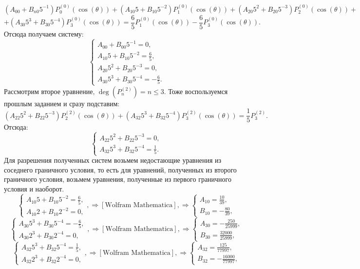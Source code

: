 \documentclass[11pt]{article}
\begin{document}
 $$(A_{00}+B_{n0}5^{-1})P_0^{(0)}(\cos(\theta))+(A_{10}5+B_{10}5^{-2})P_1^{(0)}(\cos(\theta))+(A_{20}5^2+B_{20}5^{-3})P_2^{(0)}(\cos(\theta))+$$$$+(A_{30}5^3+B_{30}5^{-4})P_3^{(0)}(\cos(\theta))=\frac{6}{5}P_1^{(0)}(\cos(\theta))-\frac{6}{5}P_3^{(0)}(\cos(\theta)).$$
 Отсюда получаем систему:
 $$\begin{cases}
     A_{00}+B_{00}5^{-1}=0,\\
     A_{10}5+B_{10}5^{-2}=\frac{6}{5},\\
     A_{20}5^2+B_{20}5^{-3}=0,\\
     A_{30}5^3+B_{30}5^{-4}=-\frac{6}{5}.
 \end{cases}$$
 Рассмотрим второе уравнение, $\deg(P_n^{(2)})=n\leq3.$ Тоже воспользуемся прошлым заданием и сразу подставим:
 $$(A_{22}5^2+B_{22}5^{-3})P_2^{(2)}(\cos(\theta))+(A_{32}5^3+B_{32}5^{-4})P_3^{(2)}(\cos(\theta))=\frac{1}{5}P_3^{(2)}.$$
 Отсюда:
 $$\begin{cases}
     A_{22}5^2+B_{22}5^{-3}=0,\\
     A_{32}5^3+B_{32}5^{-4}=\frac{1}{5}.
 \end{cases}$$
 Для разрешения полученных систем возьмем недостающие уравнения из соседнего граничного условия, то есть для уравнений, полученных из второго граничного условия, возьмем уравнения, полученные из первого граничного условия и наоборот.
 $$\begin{cases}
     A_{10}5+B_{10}5^{-2}=\frac{6}{5},\\
     A_{10}2+B_{10}2^{-2}=0,
 \end{cases},\Rightarrow [\text{Wolfram Mathematica}], \Rightarrow
 \begin{cases}
     A_{10}=\frac{10}{39},\\
     B_{10}=-\frac{80}{39},
 \end{cases}$$
  $$\begin{cases}
     A_{30}5^3+B_{30}5^{-4}=-\frac{6}{5},\\
     A_{30}2^3+B_{30}2^{-4}=0,
 \end{cases},\Rightarrow [\text{Wolfram Mathematica}], \Rightarrow
 \begin{cases}
     A_{30}=-\frac{250}{25999},\\
     B_{30}=\frac{32000}{25999},
 \end{cases}$$
  $$\begin{cases}
     A_{32}5^3+B_{32}5^{-4}=\frac{1}{5},\\
     A_{32}2^3+B_{32}2^{-4}=0,
 \end{cases},\Rightarrow [\text{Wolfram Mathematica}], \Rightarrow
 \begin{cases}
     A_{32}=\frac{125}{77997},\\
     B_{32}=-\frac{16000}{77997},
 \end{cases}$$
\end{document}
